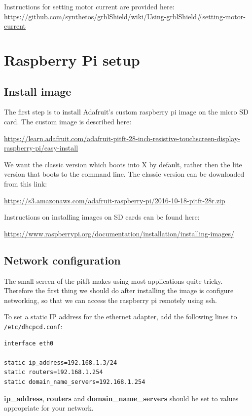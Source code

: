 \documentclass[]{book}
\theoremstyle{definition}
\theoremstyle{definition}
\theoremstyle{remark}
\begin{document}
Instructions for setting motor current are provided here:
\url{https://github.com/synthetos/grblShield/wiki/Using-grblShield\#setting-motor-current}

\chapter{Raspberry Pi setup}\label{raspberry-pi-setup}

\section{Install image}\label{install-image}

The first step is to install Adafruit's custom raspberry pi image on the
micro SD card. The custom image is described here:

\url{https://learn.adafruit.com/adafruit-pitft-28-inch-resistive-touchscreen-display-raspberry-pi/easy-install}

We want the classic version which boots into X by default, rather then
the lite version that boots to the command line. The classic version can
be downloaded from this link:

\url{https://s3.amazonaws.com/adafruit-raspberry-pi/2016-10-18-pitft-28r.zip}

Instructions on installing images on SD cards can be found here:

\url{https://www.raspberrypi.org/documentation/installation/installing-images/}

\section{Network configuration}\label{network-configuration}

The small screen of the pitft makes using most applications quite
tricky. Therefore the first thing we should do after installing the
image is configure networking, so that we can access the raspberry pi
remotely using ssh.

To set a static IP address for the ethernet adapter, add the following
lines to \texttt{/etc/dhcpcd.conf}:

\begin{verbatim}
interface eth0

static ip_address=192.168.1.3/24
static routers=192.168.1.254
static domain_name_servers=192.168.1.254
\end{verbatim}

\textbf{ip\_address}, \textbf{routers} and
\textbf{domain\_name\_servers} should be set to values appropriate for
your network.
\end{document}
